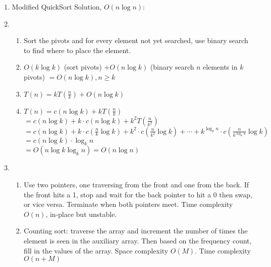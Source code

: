 \documentclass[12pt, a4paper]{article}
\begin{document}
\begin{enumerate}[Q\arabic*.]
  \item Modified QuickSort Solution, $O(n\log n)$:

  \item 
    \begin{enumerate}[(\alph*.)]
      \item Sort the pivots and for every element not yet searched, use binary search to find where to place the element.

      \item $O(k\log k)$ (sort pivots) $ + O(n\log k)$ (binary search $n$ elements in $k$ pivots) $= O(n\log k), n\geq k$

      \item $T(n) = kT(\frac{n}{k}) + O(n\log k)$ 

      \item $T(n) = c(n\log k) + kT(\frac{n}{k})$\\$= c(n\log k) + k\cdot c(n\log k) + k^2T(\frac{n}{k^2})$\\$= c(n\log k) + k\cdot c(\frac{n}{k}\log k) + k^2\cdot c(\frac{n}{k^2}\log k) + \cdots + k^{\log_kn}\cdot c(\frac{n}{k^{\log_kn}}\log k)$\\$=c(n\log k) \cdot \log_kn$\\$= O(n\log k \log_kn) = O(n\log n)$
    \end{enumerate}

  \item 
    \begin{enumerate}[(\alph*.)]
      \item Use two pointers, one traversing from the front and one from the back. If the front hits a 1, stop and wait for the back pointer to hit a 0 then swap, or vice versa. Terminate when both pointers meet. Time complexity $O(n)$, in-place but unstable.

      \item Counting sort: traverse the array and increment the number of times the element is seen in the auxiliary array. Then based on the frequency count, fill in the values of the array. Space complexity $O(M)$. Time complexity $O(n+M)$


\end{enumerate}
\end{enumerate}
\end{document}
